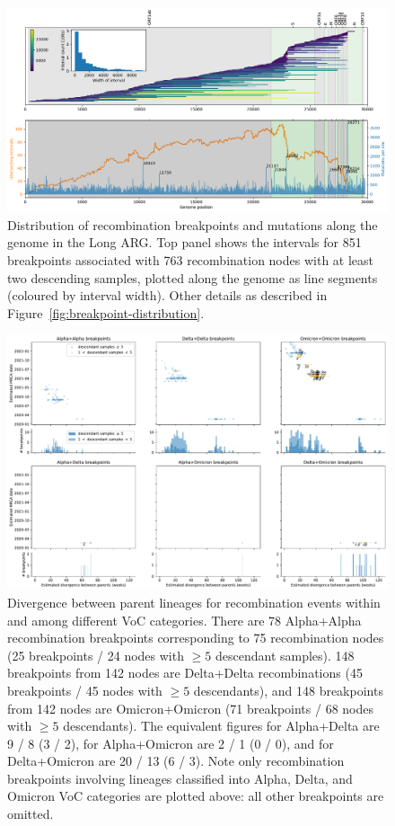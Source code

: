 \documentclass{article}
\begin{document}
\begin{figure}
\centering
\includegraphics[width=\textwidth]{figures/long_arg_recombination_intervals.pdf}
\caption{\label{fig:long_arg_breakpoint_distribution}
Distribution of recombination breakpoints and mutations along the genome in
the Long ARG.
Top panel shows the intervals for 851 breakpoints associated
with 763 recombination nodes with at least two descending samples, plotted along the genome
as line segments (coloured by interval width).
Other details as described in Figure~\ref{fig:breakpoint-distribution}.}
\end{figure}


\begin{figure} \centering
\includegraphics[width=\textwidth]{figures/supp_recombination_node_mrcas.pdf}
\caption{\label{fig:recomb_mrcas_voc_breakdown}  Divergence between parent
lineages for recombination events within and among different VoC categories.
There are 78 Alpha+Alpha recombination breakpoints corresponding to 75 recombination nodes
(25 breakpoints / 24 nodes with $\geq5$ descendant samples).
148 breakpoints from 142 nodes are Delta+Delta recombinations (45 breakpoints / 45 nodes with  $\geq5$ descendants),
and 148 breakpoints from 142 nodes are Omicron+Omicron (71 breakpoints / 68 nodes with $\geq5$ descendants).
The equivalent figures for Alpha+Delta are 9 / 8 (3 / 2),
for Alpha+Omicron are 2 / 1 (0 / 0),
and for Delta+Omicron are 20 / 13 (6 / 3).
Note only recombination breakpoints involving lineages
classified into Alpha, Delta, and Omicron VoC categories are plotted above:
all other breakpoints are omitted.
}
\end{figure}
\end{document}
